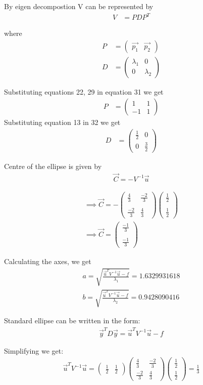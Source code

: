 \documentclass[journal,12pt,twocolumn]{IEEEtran}
\newcommand{\myvec}[1]{\ensuremath{\begin{pmatrix}#1\end{pmatrix}}}
\begin{document}
By eigen decompostion V can be represented by
\begin{align}
    V&=PDP^T
\end{align}

where 
\begin{align}
P&=\myvec{\vec{p_1} & \vec{p_2}}\label{2.32}\\
D&=\myvec{\lambda_1 & 0 \\0 & \lambda_2}
\end{align}

Substituting equations 22, 29 in equation 31 we get 
\begin{align}
    P&=\myvec{1 & 1 \\-1 & 1}
\end{align}
Substituting equation 13 in 32 we get
\begin{align}
       D&=\myvec{\frac{1}{2} & 0\\0 & \frac{3}{2}}
\end{align}

Centre of the ellipse is given by 
\begin{align}
    \vec{C}=-V^{-1}\vec{u}
\end{align}

\begin{align}
    \implies\vec{C}=-\myvec{\frac{4}{3}&\frac{-2}{3}\\\\\frac{-2}{3}&\frac{4}{3}}\myvec{\frac{1}{2}\\\\\frac{1}{2}}\\
    \implies\vec{C}=\myvec{\frac{-1}{3}\\\\\frac{-1}{3}}
\end{align}

Calculating the axes, we get
\begin{align}
a=\sqrt{\frac{\vec{u}^TV^{-1}\vec{u}-f}{\lambda_1}}=1.6329931618\\
b=\sqrt{\frac{\vec{u}^TV^{-1}\vec{u}-f}{\lambda_2}}=0.9428090416
\end{align}

Standard ellipse can be written in the form:
\begin{align}
    \vec{y}^TD\vec{y}=\vec{u}^TV^{-1}\vec{u}-f
\end{align}

Simplifying we get:
\begin{align}
\vec{u}^TV^{-1}\vec{u}=
\myvec{\frac{1}{2} &\frac{1}{2}}
\myvec{\frac{4}{3} & \frac{-2}{3}\\\frac{-2}{3} & \frac{4}{3}}
\myvec{\frac{1}{2}\\\frac{1}{2}} = \frac{1}{3}
\end{align}
\end{document}
